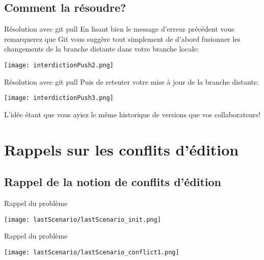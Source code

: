 \documentclass{beamer}
\begin{document}
\subsection{Comment la résoudre?}
\begin{frame}{Résolution avec git pull}
En lisant bien le message d'erreur précédent vous remarquerez que Git vous suggère tout simplement de d'abord fusionner les changements de la branche distante dans votre branche locale:
\begin{center}
	\texttt{[image: interdictionPush2.png]}
\end{center}
\end{frame}

\begin{frame}{Résolution avec git pull}
Puis de retenter votre mise à jour de la branche distante:
\begin{center}
	\texttt{[image: interdictionPush3.png]}
\end{center}
L'idée étant que vous ayiez le même historique de versions que vos collaborateurs!
\end{frame}





\section{Rappels sur les conflits d'édition}

\subsection{Rappel de la notion de conflits d'édition}
\begin{frame}{Rappel du problème}
\begin{center}
    \texttt{[image: lastScenario/lastScenario\_init.png]}
\end{center}
\end{frame}

\begin{frame}{Rappel du problème}
\begin{center}
    \texttt{[image: lastScenario/lastScenario\_conflict1.png]}
\end{center}
\end{frame}
\end{document}
